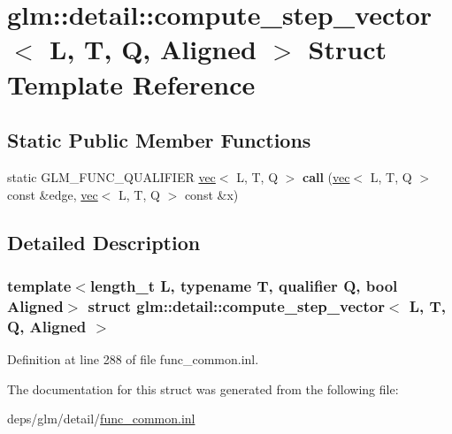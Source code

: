 \hypertarget{structglm_1_1detail_1_1compute__step__vector}{}\section{glm\+:\+:detail\+:\+:compute\+\_\+step\+\_\+vector$<$ L, T, Q, Aligned $>$ Struct Template Reference}
\label{structglm_1_1detail_1_1compute__step__vector}
\subsection*{Static Public Member Functions}
\begin{DoxyCompactItemize}
\item 
\mbox{\label{structglm_1_1detail_1_1compute__step__vector_a495017a548067602a85fc3b9eb8563be}} 
static G\+L\+M\+\_\+\+F\+U\+N\+C\+\_\+\+Q\+U\+A\+L\+I\+F\+I\+ER \hyperlink{structglm_1_1vec}{vec}$<$ L, T, Q $>$ {\bfseries call} (\hyperlink{structglm_1_1vec}{vec}$<$ L, T, Q $>$ const \&edge, \hyperlink{structglm_1_1vec}{vec}$<$ L, T, Q $>$ const \&x)
\end{DoxyCompactItemize}


\subsection{Detailed Description}
\subsubsection*{template$<$length\+\_\+t L, typename T, qualifier Q, bool Aligned$>$\newline
struct glm\+::detail\+::compute\+\_\+step\+\_\+vector$<$ L, T, Q, Aligned $>$}



Definition at line 288 of file func\+\_\+common.\+inl.



The documentation for this struct was generated from the following file\+:\begin{DoxyCompactItemize}
\item 
deps/glm/detail/\hyperlink{func__common_8inl}{func\+\_\+common.\+inl}\end{DoxyCompactItemize}
